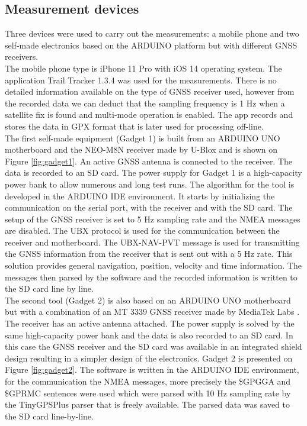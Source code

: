 \documentclass{article}
\begin{document}
		\subsection{Measurement devices}
			Three devices were used to carry out the measurements: a mobile phone and two self-made electronics based on the ARDUINO platform but with different GNSS receivers. \\
			The mobile phone type is iPhone 11 Pro with iOS 14 operating system. The application Trail Tracker 1.3.4 was used for the measurements. There is no detailed information available on the type of GNSS receiver used, however from the recorded data we can deduct that the sampling frequency is 1 Hz when a satellite fix is found and multi-mode operation is enabled. The app records and stores the data in GPX format \cite{GPXSchemaDocumentation} that is later used for processing off-line. \\
			The first self-made equipment (Gadget 1) is built from an ARDUINO UNO motherboard and the NEO-M8N receiver made by U-Blox \cite{NEOM8SeriesUblox} and is shown on Figure \ref{fig:gadget1}. An active GNSS antenna is connected to the receiver. The data is recorded to an SD card. The power supply for Gadget 1 is a high-capacity power bank to allow numerous and long test runs. The algorithm for the tool is developed in the ARDUINO IDE environment. It starts by initializing the communication on the serial port, with the receiver and with the SD card. The setup of the GNSS receiver is set to 5 Hz sampling rate and the NMEA messages are disabled. The UBX protocol \cite{UbloxUbloxM82021} is used for the communication between the receiver and motherboard. The UBX-NAV-PVT message is used for transmitting the GNSS information from the receiver that is sent out with a 5 Hz rate. This solution provides general navigation, position, velocity and time information. The messages then parsed by the software and the recorded information is written to the SD card line by line. \\
			The second tool (Gadget 2) is also based on an ARDUINO UNO motherboard but with a combination of an MT 3339 GNSS receiver made by MediaTek Labs \cite{MT3339MediaTekLabs}. The receiver has an active antenna attached. The power supply is solved by the same high-capacity power bank and the data is also recorded to an SD card. In this case the GNSS receiver and the SD card was available in an integrated shield design \cite{OverviewAdafruitUltimate} resulting in a simpler design of the electronics. Gadget 2 is presented on Figure \ref{fig:gadget2}. The software is written in the ARDUINO IDE environment, for the communication the NMEA messages, more precisely the \$GPGGA and \$GPRMC sentences were used which were parsed with 10 Hz sampling rate by the TinyGPSPlus parser \cite{TinyGPSArduiniana} that is freely available. The parsed data was saved to the SD card line-by-line. \\
\end{document}
